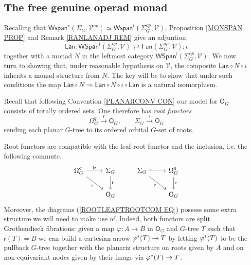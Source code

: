 \documentclass[a4paper,10pt]{article}%
\begin{document}
\subsection{The free genuine operad monad}

Recalling that 
$\mathsf{Wspan}^r(\Sigma_G,\mathcal{V}^{op}) \simeq 
\mathsf{Wspan}^l(\Sigma_G^{op},\mathcal{V})$,
Proposition \ref{MONSPAN PROP} and Remark \ref{RANLANADJ REM} give an adjuntion
\begin{equation}\label{LANIOTAADJ EQ}
	\mathsf{Lan} \colon
	\mathsf{WSpan}^l(\Sigma^{op}_G, \mathcal{V})
		\rightleftarrows
	\mathsf{Fun}(\Sigma^{op}_G, \mathcal{V})
	\colon \iota
\end{equation}
together with a monad $N$ in the leftmost category $\mathsf{WSpan}^l(\Sigma^{op}_G, \mathcal{V})$. We now turn to showing that, under reasonable hypothesis on $\mathcal{V}$, the composite
$\mathsf{Lan} \circ N \circ \iota$ inherits a monad structure from $N$. The key will be to show that under such conditions the map
$
\mathsf{Lan} \circ N \Rightarrow \mathsf{Lan} \circ N \circ \iota \circ \mathsf{Lan}
$
is a natural isomorphism.


Recall that following Convention \ref{PLANARCONV CON} our model for  $\mathsf{O}_G$ consists of totally ordered sets.
One therefore has \textit{root functors} 
\[
\Omega_G^q \xrightarrow{\mathsf{r}} \mathsf{O}_G,
	\qquad
\Sigma_G \xrightarrow{\mathsf{r}} \mathsf{O}_G
\]
sending each planar $G$-tree to its ordered orbital $G$-set of roots.

Root functors are compatible with the leaf-root functor and the inclusion, i.e. the following commute.
\begin{equation}\label{ROOTLEAFTROOTCOM EQ}
\begin{tikzcd}
	\Omega_G^q \ar{r}{\mathsf{lr}} \ar{rd}[swap]{\mathsf{r}}&
	\Sigma_G \ar{d}{\mathsf{r}} &
	\Sigma_G \ar[hookrightarrow]{r} \ar{rd}[swap]{\mathsf{r}}&
	\Omega_G^q \ar{d}{\mathsf{r}}
\\
	& \mathsf{O}_G  &
	& \mathsf{O}_G
\end{tikzcd}
\end{equation}
Moreover, the diagrams (\ref{ROOTLEAFTROOTCOM EQ}) possess some extra structure we will need to make use of. 
Indeed, both functors are split Grothendieck fibrations: given a map 
$\varphi \colon A \to B$
in $\mathsf{O}_G$
and $G$-tree $T$ such that $\mathsf{r}(T)=B$
we can build a cartesian arrow 
$\varphi^{\**}(T) \to T$
by letting $\varphi^{\**}(T)$ to be the pullback $G$-tree
together with the planariz structure on roots given by $A$ and on non-equivariant nodes given by their image via 
$\varphi^{\**}(T) \to T$.
\end{document}
